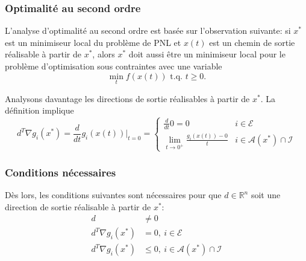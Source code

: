 \documentclass[usepdftitle=false,aspectratio=169]{beamer}
\def\cA{\mathcal{A}}
\def\cE{\mathcal{E}}
\def\cI{\mathcal{I}}
\def\RR{\mathbb{R}}
\begin{document}
\begin{frame}
\frametitle{Optimalité au second ordre}

L'analyse d'optimalité au second ordre est basée sur l'observation suivante: si $x^*$ est un minimiseur local du problème de PNL et $x(t)$ est un chemin de sortie réalisable à partir de $x^*$, alors $x^*$ doit aussi être un minimiseur local pour le problème d'optimisation sous contraintes avec une variable
$$
\min_t f(x(t)) \mbox{ t.q. } t \geq 0.
$$

\mbox{}

Analysons davantage les directions de sortie réalisables à partir de $x^*$.
La définition implique
$$
d^T \nabla g_i(x^*)
= \frac{d}{dt} g_i(x(t)) |_{t = 0}
= \begin{cases}
\frac{d}{dt} 0 = 0 & i \in \cE \\
\lim_{t \rightarrow 0^+} \frac{g_i(x(t))-0}{t} & i \in \cA(x^*) \cap \cI
\end{cases}
$$

\end{frame}

\begin{frame}
\frametitle{Conditions nécessaires}

Dès lors, les conditions suivantes sont nécessaires pour que $d \in \RR^n$ soit une direction de sortie réalisable à partir de $x^*$:
\begin{align*}
d & \ne 0 \\
d^T \nabla g_i(x^*) &= 0,\ i \in \cE \\
d^T \nabla g_i(x^*) &\leq 0,\ i \in \cA(x^*) \cap \cI
\end{align*}

\end{frame}


\end{document}

